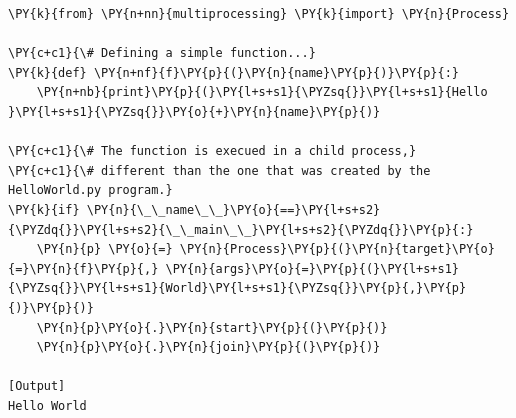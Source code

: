 \begin{Verbatim}[label=\makebox{\url{https://github.com/lucabaldini/cmepda/tree/master/slides/latex/snippets/hello_multiprocessing.py}},commandchars=\\\{\}]
\PY{k}{from} \PY{n+nn}{multiprocessing} \PY{k}{import} \PY{n}{Process}

\PY{c+c1}{\# Defining a simple function...}
\PY{k}{def} \PY{n+nf}{f}\PY{p}{(}\PY{n}{name}\PY{p}{)}\PY{p}{:}
    \PY{n+nb}{print}\PY{p}{(}\PY{l+s+s1}{\PYZsq{}}\PY{l+s+s1}{Hello }\PY{l+s+s1}{\PYZsq{}}\PY{o}{+}\PY{n}{name}\PY{p}{)}

\PY{c+c1}{\# The function is execued in a child process,}
\PY{c+c1}{\# different than the one that was created by the HelloWorld.py program.}
\PY{k}{if} \PY{n}{\_\_name\_\_}\PY{o}{==}\PY{l+s+s2}{\PYZdq{}}\PY{l+s+s2}{\_\_main\_\_}\PY{l+s+s2}{\PYZdq{}}\PY{p}{:}
    \PY{n}{p} \PY{o}{=} \PY{n}{Process}\PY{p}{(}\PY{n}{target}\PY{o}{=}\PY{n}{f}\PY{p}{,} \PY{n}{args}\PY{o}{=}\PY{p}{(}\PY{l+s+s1}{\PYZsq{}}\PY{l+s+s1}{World}\PY{l+s+s1}{\PYZsq{}}\PY{p}{,}\PY{p}{)}\PY{p}{)}
    \PY{n}{p}\PY{o}{.}\PY{n}{start}\PY{p}{(}\PY{p}{)}
    \PY{n}{p}\PY{o}{.}\PY{n}{join}\PY{p}{(}\PY{p}{)}

[Output]
Hello World
\end{Verbatim}